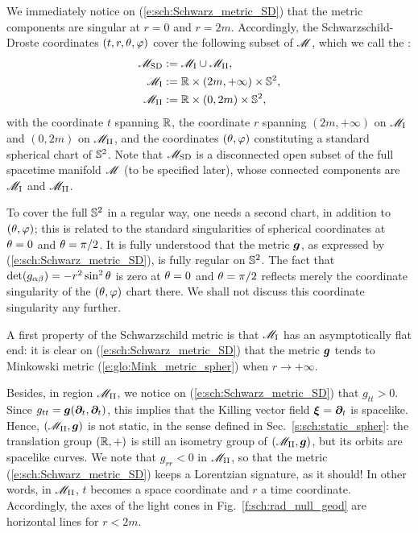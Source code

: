 We immediately notice on (\ref{e:sch:Schwarz_metric_SD}) that the metric
components are singular at $r=0$ and $r=2m$. Accordingly, the Schwarzschild-Droste coordinates $(t,r,\theta,\varphi)$ cover the following subset of $\mathscr{M}$, which we call the
:
\begin{subequations}
\begin{align}
    \mathscr{M}_{\rm SD} & :=  \mathscr{M}_{\rm I} \cup \mathscr{M}_{\rm II} , \\
    \mathscr{M}_{\rm I} & :=  \mathbb{R}\times(2m,+\infty)\times\mathbb{S}^2 ,\\
    \mathscr{M}_{\rm II} & :=  \mathbb{R}\times(0,2m)\times\mathbb{S}^2 ,
\end{align}
\end{subequations}
with the coordinate $t$ spanning $\mathbb{R}$, the coordinate $r$ spanning $(2m,+\infty)$
on $\mathscr{M}_{\rm I}$ and $(0,2m)$ on $\mathscr{M}_{\rm II}$, and the coordinates $(\theta,\varphi)$
constituting a standard spherical chart of $\mathbb{S}^2$.
Note that $\mathscr{M}_{\rm SD}$ is a disconnected open subset of the full spacetime
manifold $\mathscr{M}$ (to be specified later), whose connected components are
$\mathscr{M}_{\rm I}$ and $\mathscr{M}_{\rm II}$.

\begin{remark}
To cover the full $\mathbb{S}^2$ in a regular way, one needs a second chart, in
addition to $(\theta,\varphi)$; this is related to the standard singularities of
spherical coordinates at $\theta=0$ and $\theta=\pi/2$. It is fully understood
that the metric $\bm{g}$, as expressed by (\ref{e:sch:Schwarz_metric_SD}), is
fully regular on $\mathbb{S}^2$. The fact that $\det(g_{\alpha\beta}) = -r^2\sin^2\theta$ is zero
at $\theta=0$ and $\theta=\pi/2$ reflects merely the coordinate singularity
of the $(\theta,\varphi)$ chart there. We shall not discuss this coordinate singularity
any further.
\end{remark}

A first property of the Schwarzschild metric is that $\mathscr{M}_{\rm I}$ has an
asymptotically flat end: it is clear on (\ref{e:sch:Schwarz_metric_SD})
that the metric $\bm{g}$ tends to Minkowski metric (\ref{e:glo:Mink_metric_spher})
when $r\rightarrow +\infty$.

Besides, in region $\mathscr{M}_{\rm II}$, we notice on (\ref{e:sch:Schwarz_metric_SD})
that $g_{tt} > 0$. Since $g_{tt} = \bm{g}(\bm{\partial}_t,\bm{\partial}_t)$, this implies
that the Killing vector field $\bm{\xi} = \bm{\partial}_t$ is spacelike. Hence,
$(\mathscr{M}_{\rm II},\bm{g})$ is not static, in the sense defined in
Sec.~\ref{s:sch:static_spher}: the translation group $(\mathbb{R},+)$ is still an
isometry group of $(\mathscr{M}_{\rm II},\bm{g})$, but its orbits are spacelike curves.
We note that $g_{rr} < 0$ in $\mathscr{M}_{\rm II}$, so that the
metric (\ref{e:sch:Schwarz_metric_SD}) keeps a Lorentzian signature,
as it should!
In other words, in $\mathscr{M}_{\rm II}$, $t$ becomes a space coordinate and
$r$ a time coordinate. Accordingly, the axes of the light cones
in Fig.~\ref{f:sch:rad_null_geod} are horizontal lines for $r<2m$.

